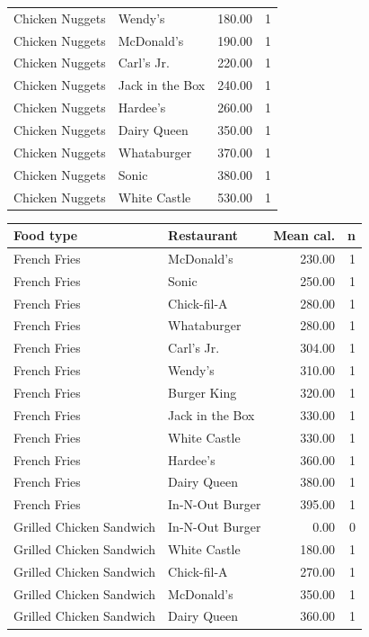 \documentclass[11pt]{article}
\begin{document}
\begin{table}[H]
\begin{minipage}{0.49\textwidth}
\begin{tabular}{llrr}
Chicken Nuggets & Wendy's & 180.00 & 1 \\
Chicken Nuggets & McDonald's & 190.00 & 1 \\
Chicken Nuggets & Carl's Jr. & 220.00 & 1 \\
Chicken Nuggets & Jack in the Box & 240.00 & 1 \\
Chicken Nuggets & Hardee's & 260.00 & 1 \\
Chicken Nuggets & Dairy Queen & 350.00 & 1 \\
Chicken Nuggets & Whataburger & 370.00 & 1 \\
Chicken Nuggets & Sonic & 380.00 & 1 \\
Chicken Nuggets & White Castle & 530.00 & 1 \\
\bottomrule
\end{tabular}
\end{minipage}\hfill
\begin{minipage}{0.49\textwidth}\centering
\begin{tabular}{llrr}
\toprule
Food type & Restaurant & Mean cal. & n \\
\midrule
French Fries & McDonald's & 230.00 & 1 \\
French Fries & Sonic & 250.00 & 1 \\
French Fries & Chick-fil-A & 280.00 & 1 \\
French Fries & Whataburger & 280.00 & 1 \\
French Fries & Carl's Jr. & 304.00 & 1 \\
French Fries & Wendy's & 310.00 & 1 \\
French Fries & Burger King & 320.00 & 1 \\
French Fries & Jack in the Box & 330.00 & 1 \\
French Fries & White Castle & 330.00 & 1 \\
French Fries & Hardee's & 360.00 & 1 \\
French Fries & Dairy Queen & 380.00 & 1 \\
French Fries & In-N-Out Burger & 395.00 & 1 \\
Grilled Chicken Sandwich & In-N-Out Burger & 0.00 & 0 \\
Grilled Chicken Sandwich & White Castle & 180.00 & 1 \\
Grilled Chicken Sandwich & Chick-fil-A & 270.00 & 1 \\
Grilled Chicken Sandwich & McDonald's & 350.00 & 1 \\
Grilled Chicken Sandwich & Dairy Queen & 360.00 & 1 \\

\end{tabular}
\end{minipage}
\end{table}
\end{document}
